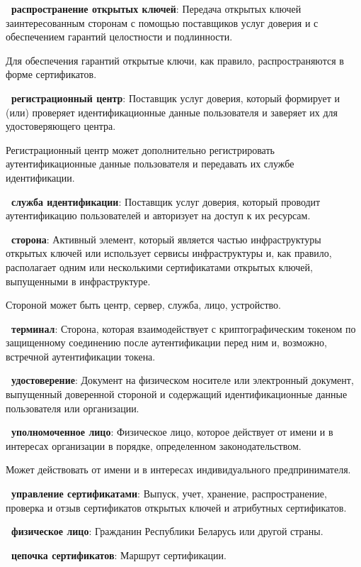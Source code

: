 {\bf\thedefctr~распространение открытых ключей}: 
Передача открытых ключей заинтересованным сторонам с помощью поставщиков 
услуг доверия и с обеспечением гарантий целостности и подлинности.

\begin{note*}
Для обеспечения гарантий открытые ключи, как правило, распространяются в 
форме сертификатов.
\end{note*}

{\bf\thedefctr~регистрационный центр}: 
Поставщик услуг доверия, который формирует и (или) проверяет идентификационные 
данные пользователя и заверяет их для удостоверяющего центра.

\begin{note*}
Регистрационный центр может дополнительно регистрировать аутентификационные
данные пользователя и передавать их службе идентификации.
\end{note*}

{\bf\thedefctr~служба идентификации}: 
Поставщик услуг доверия, который проводит аутентификацию 
пользователей и авторизует на доступ к их ресурсам.

{\bf\thedefctr~сторона}: 
Активный элемент, который является 
частью инфраструктуры открытых ключей или использует сервисы 
инфраструктуры и, как правило, располагает одним или несколькими 
сертификатами открытых ключей, выпущенными в инфраструктуре.

\begin{note*}
Стороной может быть центр, сервер, служба, лицо, устройство.
\end{note*}

{\bf\thedefctr~терминал}: 
Сторона, которая взаимодействует с криптографическим токеном по защищенному
соединению после аутентификации перед ним и, возможно, встречной аутентификации
токена.

{\bf\thedefctr~удостоверение}: 
Документ на физическом носителе или электронный документ, выпущенный 
доверенной стороной и содержащий идентификационные данные пользователя или 
организации.

{\bf\thedefctr~уполномоченное лицо}: 
Физическое лицо, которое действует от имени и в интересах организации
в порядке, определенном законодательством.

\begin{note*}
Может действовать от имени и в интересах индивидуального предпринимателя.
\end{note*}

{\bf\thedefctr~управление сертификатами}: 
Выпуск, учет, хранение, распространение, проверка и отзыв сертификатов открытых 
ключей и атрибутных сертификатов.

{\bf\thedefctr~физическое лицо}: 
Гражданин Республики Беларусь или другой страны.

{\bf\thedefctr~цепочка сертификатов}: 
Маршрут сертификации.

